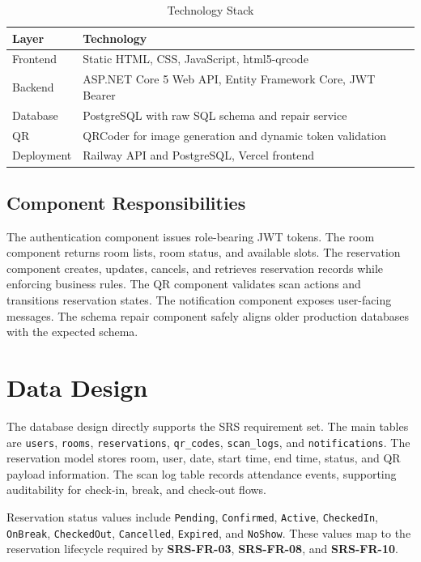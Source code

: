 \documentclass[conference]{IEEEtran}
\newcommand{\srs}[1]{\textbf{#1}}
\begin{document}
\begin{table}[htbp]
\caption{Technology Stack}
\label{tab:stack}
\centering
\begin{tabularx}{\linewidth}{@{}lX@{}}
\toprule
\textbf{Layer} & \textbf{Technology} \\
\midrule
Frontend & Static HTML, CSS, JavaScript, html5-qrcode \\
Backend & ASP.NET Core 5 Web API, Entity Framework Core, JWT Bearer \\
Database & PostgreSQL with raw SQL schema and repair service \\
QR & QRCoder for image generation and dynamic token validation \\
Deployment & Railway API and PostgreSQL, Vercel frontend \\
\bottomrule
\end{tabularx}
\end{table}

\subsection{Component Responsibilities}
The authentication component issues role-bearing JWT tokens. The room component
returns room lists, room status, and available slots. The reservation component
creates, updates, cancels, and retrieves reservation records while enforcing
business rules. The QR component validates scan actions and transitions
reservation states. The notification component exposes user-facing messages.
The schema repair component safely aligns older production databases with the
expected schema.

\section{Data Design}
The database design directly supports the SRS requirement set. The main tables
are \texttt{users}, \texttt{rooms}, \texttt{reservations}, \texttt{qr\_codes},
\texttt{scan\_logs}, and \texttt{notifications}. The reservation model stores
room, user, date, start time, end time, status, and QR payload information.
The scan log table records attendance events, supporting auditability for
check-in, break, and check-out flows.

Reservation status values include \texttt{Pending}, \texttt{Confirmed},
\texttt{Active}, \texttt{CheckedIn}, \texttt{OnBreak}, \texttt{CheckedOut},
\texttt{Cancelled}, \texttt{Expired}, and \texttt{NoShow}. These values map to
the reservation lifecycle required by \srs{SRS-FR-03}, \srs{SRS-FR-08}, and
\srs{SRS-FR-10}.
\end{document}
